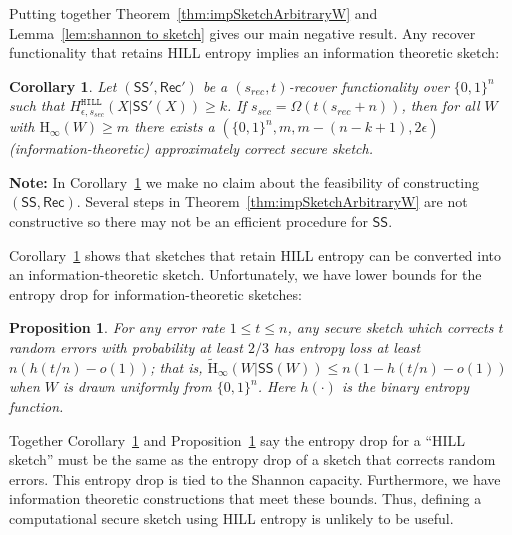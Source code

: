 \documentclass[11pt]{article}
\newcommand{\thref}[1]{\mbox{Theorem~\ref{#1}}}
\newcommand{\corref}[1]{\mbox{Corollary~\ref{#1}}}
\newcommand{\lemref}[1]{\mbox{Lemma~\ref{#1}}}
\newcommand{\propref}[1]{\mbox{Proposition~\ref{#1}}}
\newcommand{\class}[1]{{\ensuremath{\mathsf{#1}}}}
\newcommand{\sketch}{\ensuremath{\class{SS}}\xspace}
\newcommand{\rec}{\ensuremath{\class{Rec}}\xspace}
\newcommand{\hill}{\ensuremath{\mathtt{HILL}}\xspace}
\newcommand{\Hoo}{\mathrm{H}_\infty}
\newcommand{\Hav}{\tilde{\mathrm{H}}_\infty}
\newtheorem{proposition}[theorem]{Proposition}
\newtheorem{corollary}[theorem]{Corollary}
\newtheorem{construction}[theorem]{Construction}
\begin{document}
Putting together \thref{thm:impSketchArbitraryW} and \lemref{lem:shannon to sketch} gives our main negative result.  Any recover functionality that retains HILL entropy implies an information theoretic sketch:
\begin{corollary}
\label{cor:rec yields sketch}
Let $(\sketch', \rec')$ be a $(s_{rec}, t)$-recover functionality over $\{0,1\}^n$ such that $H^{\hill}_{\epsilon, s_{sec}}(X | \sketch'(X))\geq k$.  If $s_{sec}=\Omega(t(s_{rec} + n))$,  then for all $W$ with $\Hoo(W)\geq m$ there exists a $(\{0,1\}^n, m, m-(n-k+1), 2\epsilon)$ (information-theoretic) approximately correct secure sketch.
\end{corollary}
\textbf{Note:} In \corref{cor:rec yields sketch} we make no claim about the feasibility of constructing $(\sketch, \rec)$.  Several steps in \thref{thm:impSketchArbitraryW} are not constructive so there may not be an efficient procedure for $\sketch$.

\corref{cor:rec yields sketch} shows that sketches that retain HILL entropy can be converted into an information-theoretic sketch.  Unfortunately, we have lower bounds for the entropy drop for information-theoretic sketches:

\begin{proposition}
\label{prop:lower bound entropy drop}
For any error rate $1\leq t\leq n$, any secure sketch which corrects $t$ random errors with probability at least $2/3$ has entropy loss at least $n(h(t/n) -o(1))$; that is, $\Hav(W|\sketch(W))\leq n (1-h(t/n) - o(1))$ when $W$ is drawn uniformly from $\{0,1\}^n$.  Here $h(\cdot)$ is the binary entropy function.
\end{proposition}

Together \corref{cor:rec yields sketch} and \propref{prop:lower bound entropy drop} say the entropy drop for a ``HILL sketch'' must be the same as the entropy drop of a sketch that corrects random errors.  This entropy drop is tied to the Shannon capacity.  Furthermore, we have information theoretic constructions that meet these bounds.  Thus, defining a computational secure sketch using HILL entropy is unlikely to be useful.
\end{document}
